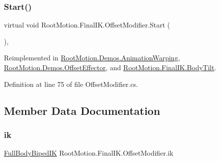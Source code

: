 \mbox{\label{class_root_motion_1_1_final_i_k_1_1_offset_modifier_a10d007a731b89218a14935a09552cb77}} 
\subsubsection{\texorpdfstring{Start()}{Start()}}
{\footnotesize\ttfamily virtual void Root\+Motion.\+Final\+I\+K.\+Offset\+Modifier.\+Start (\begin{DoxyParamCaption}{ }\end{DoxyParamCaption})\hspace{0.3cm}{\ttfamily [protected]}, {\ttfamily [virtual]}}



Reimplemented in \mbox{\hyperlink{class_root_motion_1_1_demos_1_1_animation_warping_a241d2322b0ebf23fac16d77ee0c632ed}{Root\+Motion.\+Demos.\+Animation\+Warping}}, \mbox{\hyperlink{class_root_motion_1_1_demos_1_1_offset_effector_adf550db6cfb59e9b14f0bb0e464d82bd}{Root\+Motion.\+Demos.\+Offset\+Effector}}, and \mbox{\hyperlink{class_root_motion_1_1_final_i_k_1_1_body_tilt_a221000faf3644c7bda0c809ba09acff4}{Root\+Motion.\+Final\+I\+K.\+Body\+Tilt}}.



Definition at line 75 of file Offset\+Modifier.\+cs.



\subsection{Member Data Documentation}
\mbox{\label{class_root_motion_1_1_final_i_k_1_1_offset_modifier_a6423c7ff9da3ad0208cc85524da97ec4}} 
\subsubsection{\texorpdfstring{ik}{ik}}
{\footnotesize\ttfamily \mbox{\hyperlink{class_root_motion_1_1_final_i_k_1_1_full_body_biped_i_k}{Full\+Body\+Biped\+IK}} Root\+Motion.\+Final\+I\+K.\+Offset\+Modifier.\+ik\hspace{0.3cm}{\ttfamily [protected]}}



